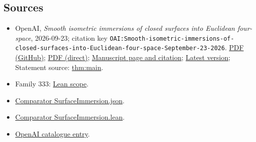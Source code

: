 \documentclass[11pt]{article}
\begin{document}
\subsection{Sources}
\begin{itemize}
\item OpenAI, \emph{Smooth isometric immersions of closed surfaces into Euclidean four-space}, 2026-09-23; citation key \texttt{OAI:Smooth-isometric-immersions-of-closed-surfaces-into-Euclidean-four-space-September-23-2026}. \href{https://github.com/openai/math/blob/adc7f1241b42e322a6451854ab7e4b4c146bf78a/preprints/Smooth-isometric-immersions-of-closed-surfaces-into-Euclidean-four-space-September-23-2026/paper.pdf}{PDF (GitHub)}; \href{https://github.com/openai/math/raw/adc7f1241b42e322a6451854ab7e4b4c146bf78a/preprints/Smooth-isometric-immersions-of-closed-surfaces-into-Euclidean-four-space-September-23-2026/paper.pdf}{PDF (direct)}; \href{https://github.com/openai/math/blob/adc7f1241b42e322a6451854ab7e4b4c146bf78a/preprints/Smooth-isometric-immersions-of-closed-surfaces-into-Euclidean-four-space-September-23-2026/README.md}{Manuscript page and citation}; \href{https://github.com/openai/math/blob/main/preprints/Smooth-isometric-immersions-of-closed-surfaces-into-Euclidean-four-space-September-23-2026/paper.pdf}{Latest version}; Statement source: \href{https://github.com/openai/math/blob/adc7f1241b42e322a6451854ab7e4b4c146bf78a/preprints/Smooth-isometric-immersions-of-closed-surfaces-into-Euclidean-four-space-September-23-2026/build/introduction.tex\#L14}{thm:main}.
\item Family 333: \href{https://github.com/openai/math/blob/adc7f1241b42e322a6451854ab7e4b4c146bf78a/lean/docs/333.md}{Lean scope}.
\item \href{https://github.com/openai/math/blob/adc7f1241b42e322a6451854ab7e4b4c146bf78a/lean/ComparatorChallenges/SurfaceImmersion.json}{Comparator SurfaceImmersion.json}.
\item \href{https://github.com/openai/math/blob/adc7f1241b42e322a6451854ab7e4b4c146bf78a/lean/ComparatorChallenges/SurfaceImmersion.lean}{Comparator SurfaceImmersion.lean}.
\item \href{https://github.com/openai/math/blob/adc7f1241b42e322a6451854ab7e4b4c146bf78a/CONTENTS.md}{OpenAI catalogue entry}.
\end{itemize}
\end{document}
